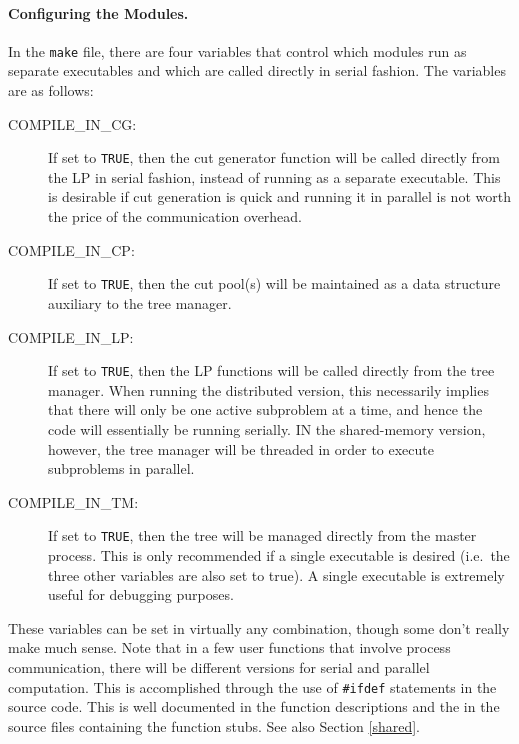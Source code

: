 \paragraph{Configuring the Modules.}
\label{configuration}
In the {\tt make} file, there are
four variables that control which modules run as separate executables
and which are called directly in serial fashion. The variables are as
follows:
\begin{description}
        \item [COMPILE\_IN\_CG:] If set to {\tt TRUE}, then the cut generator
        function will be called directly from the LP in serial
        fashion, instead of running as a separate executable. This is
        desirable if cut generation is quick and running it in
        parallel is not worth the price of the communication overhead.
        \item [COMPILE\_IN\_CP:] If set to {\tt TRUE}, then the cut
        pool(s) will be maintained as a data structure auxiliary to the
        tree manager. 
        \item [COMPILE\_IN\_LP:] If set to {\tt TRUE}, then the LP
        functions will be called directly from the tree manager. When
        running the distributed version, this
        necessarily implies that there will only be one active
        subproblem at a time, and hence the code will essentially be
        running serially. IN the shared-memory version, however, the
        tree manager will be threaded in order to execute subproblems 
        in parallel.
        \item [COMPILE\_IN\_TM:] If set to {\tt TRUE}, then the tree
        will be managed directly from the master process. This is only
        recommended if a single executable is desired (i.e.~the three
        other variables are also set to true). A single executable is
        extremely useful for debugging purposes.
\end{description}
These variables can be set in virtually any combination, though some
don't really make much sense. Note that in a few user functions that
involve process communication, there will be different versions for
serial and parallel computation. This is accomplished through the use
of {\tt \#ifdef} statements in the source code. This is well documented
in the function descriptions and the in the source files containing
the function stubs. See also Section \ref{shared}.

